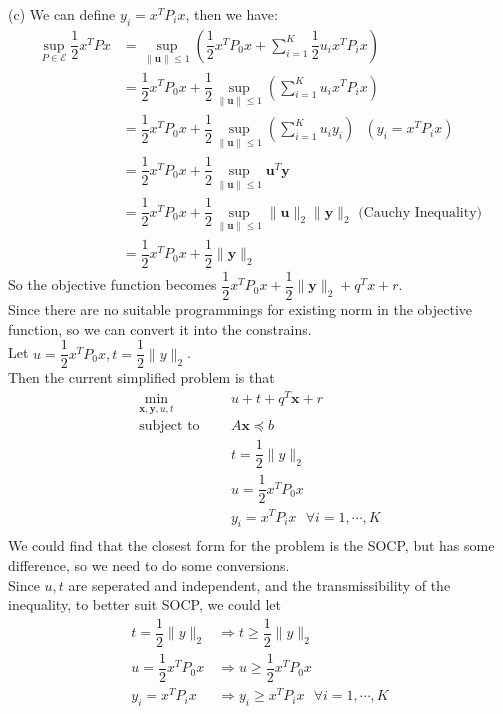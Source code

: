 (c) We can define $y_i=x^T P_i x$, then we have:
\begin{align*}
    \sup_{P \in \mathcal{E}}\dfrac{1}{2} x^T P x &= \sup_{\|\mathbf{u}\|\leq 1}\left(\dfrac{1}{2} x^T P_0 x + \sum_{i=1}^{K}\dfrac{1}{2} u_ix^T P_i x\right) \\
    &= \dfrac{1}{2} x^T P_0 x + \dfrac{1}{2}\sup_{\|\mathbf{u}\|\leq 1}\left(\sum_{i=1}^{K} u_ix^T P_i x\right) \\
    &= \dfrac{1}{2} x^T P_0 x + \dfrac{1}{2}\sup_{\|\mathbf{u}\|\leq 1}\left(\sum_{i=1}^{K} u_iy_i \right) \text{\ \ \ \ \ \ \ } (y_i=x^T P_i x)\\
    &= \dfrac{1}{2} x^T P_0 x + \dfrac{1}{2}\sup_{\|\mathbf{u}\|\leq 1}\mathbf{u}^T\mathbf{y} \\
    &= \dfrac{1}{2} x^T P_0 x + \dfrac{1}{2}\sup_{\|\mathbf{u}\|\leq 1}\|\mathbf{u}\|_2\|\mathbf{y}\|_2 \text{\ \ \ \ \ \ \ \ \ (Cauchy Inequality)} \\
    &= \dfrac{1}{2} x^T P_0 x + \dfrac{1}{2}\|\mathbf{y}\|_2
\end{align*}
So the objective function becomes $\dfrac{1}{2} x^T P_0 x + \dfrac{1}{2}\|\mathbf{y}\|_2 + q^T x+r$.\\
Since there are no suitable programmings for existing norm in the objective function, so we can convert it into the constrains.\\
Let $u=\dfrac{1}{2}x^TP_0x, t=\dfrac{1}{2}\|y\|_2$.\\
Then the current simplified problem is that
\begin{align*}
    \min_{\mathbf{x},\mathbf{y},u,t}\ \ \ \ \ & u+t+q^T \mathbf{x}+r \\
    \text {subject to }\ \ \ \ \ & A \mathbf{x} \preceq b \\
    & t = \dfrac{1}{2}\|y\|_2 \\
    & u = \dfrac{1}{2}x^TP_0x \\
    & y_i = x^TP_ix \ \ \ \forall i=1,\cdots,K \\
\end{align*}
We could find that the closest form for the problem is the SOCP, but has some difference, so we need to do some conversions.\\
Since $u,t$ are seperated and independent, and the transmissibility of the inequality, to better suit SOCP, we could let
\begin{align*}
    t = \dfrac{1}{2}\|y\|_2 &\Rightarrow t \geq \dfrac{1}{2}\|y\|_2\\
    u = \dfrac{1}{2}x^TP_0x &\Rightarrow u \geq \dfrac{1}{2}x^TP_0x\\
    y_i = x^TP_ix &\Rightarrow y_i \geq x^TP_ix \ \ \ \forall i=1,\cdots,K
\end{align*} 

